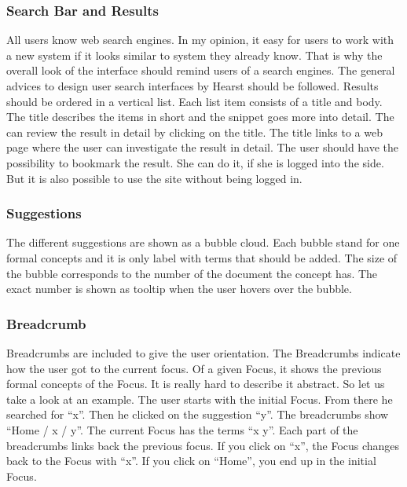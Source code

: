 \documentclass[11pt]{report}
\begin{document}
\subsubsection{Search Bar and Results}

All users know web search engines. In my opinion, it easy for users to work with a new system if it looks similar to system they already know. That is why the overall look of the interface should remind users of a search engines. The general advices to design user search interfaces by Hearst \cite{Hearst2009} should be followed. Results should be ordered in a vertical list. Each list item consists of a title and body. The title describes the items in short and the snippet goes more into detail. The can review the result in detail by clicking on the title. The title links to a web page where the user can investigate the result in detail. The user should have the possibility to bookmark the result. She can do it, if she is logged into the side. But it is also possible to use the site without being logged in.

\subsubsection{Suggestions}

The different suggestions are shown as a bubble cloud. Each bubble stand for one formal concepts and it is only label with terms that should be added. The size of the bubble corresponds to the number of the document the concept has. The exact number is shown as tooltip when the user hovers over the bubble.

\subsubsection{Breadcrumb}

Breadcrumbs are included to give the user orientation. The Breadcrumbs indicate how the user got to the current focus. Of a given Focus, it shows the previous formal concepts of the Focus. It is really hard to describe it abstract. So let us take a look at an example. The user starts with the initial Focus. From there he searched for ``x''. Then he clicked on the suggestion ``y''. The breadcrumbs show ``Home / x / y''. The current Focus has the terms ``x y''. Each part of the breadcrumbs links back the previous focus. If you click on ``x'', the Focus changes back to the Focus with ``x''. If you click on ``Home'', you end up in the initial Focus. 
\end{document}
